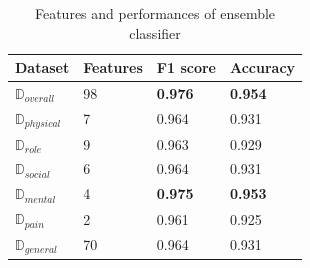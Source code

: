 \documentclass[10pt,journal,compsoc]{IEEEtran}
\begin{document}
\begin{table}[ht]
\begin{tabular}{|C{3cm}|C{3cm}|C{3cm}|C{3cm}|}
\hline
{} 
{\color[HTML]{333333} \textbf{Dataset}} & {\color[HTML]{333333} \textbf{Features}} & {\color[HTML]{333333} \textbf{F1 score}} & {\color[HTML]{333333} \textbf{Accuracy}} \\ \hline
{} 
\textbf{$\mathbb{D}_{overall}$}& 98  & \textbf{0.976}  & \textbf{0.954} \\ \hline
{} 
\textbf{$\mathbb{D}_{physical}$}& 7  & 0.964  & 0.931 \\ \hline
{} 
\textbf{$\mathbb{D}_{role}$} & 9  & 0.963   & 0.929    \\ \hline
{} 
\textbf{$\mathbb{D}_{social}$} & 6   & 0.964  & 0.931 \\ \hline
{} 
\textbf{$\mathbb{D}_{mental}$ }  & 4  & \textbf{0.975}  & \textbf{0.953}  \\ \hline
{} 
\textbf{$\mathbb{D}_{pain} $ }  & 2  & 0.961  & 0.925  \\ \hline
{} 
\textbf{$\mathbb{D}_{general}$ }  & 70  & 0.964  & 0.931  \\ \hline
\end{tabular}
\caption{Features and performances of ensemble classifier}
\label{subsets}
\end{table}
\end{document}
